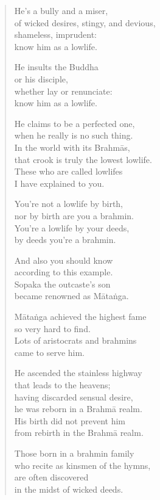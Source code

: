 \documentclass[12pt,openany]{book}%
\begin{document}
\begin{verse}
He’s a bully and a miser, \\
of wicked desires, stingy, and devious, \\
shameless, imprudent: \\
know him as a lowlife. 

He insults the Buddha \\
or his disciple, \\
whether lay or renunciate: \\
know him as a lowlife. 

He claims to be a perfected one, \\
when he really is no such thing. \\
In the world with its \textsanskrit{Brahmās}, \\
that crook is truly the lowest lowlife. \\
These who are called lowlifes \\
I have explained to you. 

You’re not a lowlife by birth, \\
nor by birth are you a brahmin. \\
You’re a lowlife by your deeds, \\
by deeds you’re a brahmin. 

And also you should know \\
according to this example. \\
Sopaka the outcaste’s son \\
became renowned as \textsanskrit{Mātaṅga}. 

\textsanskrit{Mātaṅga} achieved the highest fame \\
so very hard to find. \\
Lots of aristocrats and brahmins \\
came to serve him. 

He ascended the stainless highway \\
that leads to the heavens; \\
having discarded sensual desire, \\
he was reborn in a \textsanskrit{Brahmā} realm. \\
His birth did not prevent him \\
from rebirth in the \textsanskrit{Brahmā} realm. 

Those born in a brahmin family \\
who recite as kinsmen of the hymns, \\
are often discovered \\
in the midst of wicked deeds. 


\end{verse}
\end{document}
